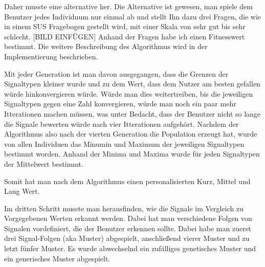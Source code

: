 Daher musste eine alternative her. Die Alternative ist gewesen, man spiele dem Benutzer jedes Individuum nur einmal ab und stellt Ihn dazu drei Fragen, die wie in einem SUS Fragebogen gestellt wird, mit einer Skala von sehr gut bis sehr schlecht. [BILD EINFÜGEN]
Anhand der Fragen habe ich einen Fitnesswert bestimmt. Die weitere Beschreibung des Algorithmus wird in der Implementierung beschrieben.

Mit jeder Generation ist man davon ausgegangen, dass die Grenzen der Signaltypen kleiner wurde und zu dem Wert, dass dem Nutzer am besten gefallen w{\"u}rde hinkonvergieren w{\"u}rde.
 W{\"u}rde man dies weitertreiben, bis die jeweiligen Signaltypen gegen eine Zahl konvergieren, w{\"u}rde man noch ein paar mehr Itterationen machen m{\"u}ssen, was unter Bedacht, dass der Benutzer nicht so lange die Signale bewerten w{\"u}rde nach vier Itterationen aufgeh{\"o}rt. Nachdem der Algorithmus also nach der vierten Generation die Population erzeugt hat, wurde von allen Individuen das Minumin und Maximum der jeweiligen Signaltypen bestimmt worden. Anhand der Minima und Maxima wurde f{\"u}r jeden Signaltypen der Mittelwert bestimmt.

Somit hat man nach dem Algorithmus einen personalisierten Kurz, Mittel und Lang Wert.

Im dritten Schritt musste man herausfinden, wie die Signale im Vergleich zu Vorgegebenen Werten erkannt werden.
Dabei hat man verschiedene Folgen von Signalen vordefiniert, die der Benutzer erkennen sollte. Dabei habe man zuerst drei Signal-Folgen (aka Muster) abgespielt, anschlie{\ss}end vierer Muster und zu letzt f{\"u}nfer Muster. Es wurde abwechselnd ein zuf{\"a}lliges genetisches Muster und ein generisches Muster abgespielt. 

